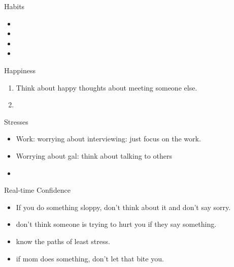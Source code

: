 \documentclass[serif, mathserif, final]{beamer}
\begin{document}
\begin{frame}{} 
  \begin{columns} 
    \begin{column}{0.25\linewidth} %
      \begin{block}{Habits}
        \begin{itemize}
          \tiny \item \tiny 
        \item \tiny 
        \item \tiny 
        \item \tiny 
        \end{itemize}
      \end{block}
      \begin{block}{Happiness} 
        \begin{enumerate}
          \tiny \item \tiny Think about happy thoughts about meeting
          someone else.  
        \item \tiny 
        \end{enumerate}
      \end{block} 

      \begin{block}{Stresses}
        \begin{itemize}
        \item \tiny Work: worrying about interviewing: just
          focus on the work. 
        \item \tiny Worrying about gal: think about talking to
          others 
        \item \tiny 
        \end{itemize} 
      \end{block}
 
      \begin{block}{Real-time Confidence}
        \begin{itemize}
          \tiny \item \tiny If you do something sloppy, don't
          think about it and don't say sorry. 
        \item \tiny don't think someone is trying to hurt you if
          they say something.
        \item \tiny know the paths of least stress. 
        \item \tiny if mom does something, don't let that bite you. 
        \end{itemize}
      \end{block}
      

\end{column}
\end{columns}
\end{frame}
\end{document}
